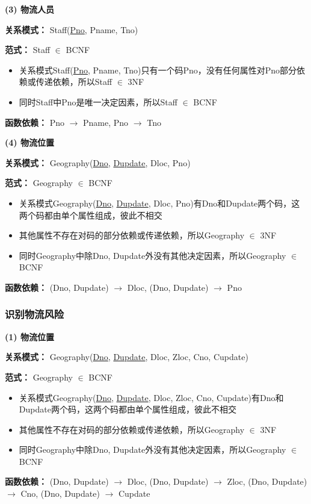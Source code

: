 \documentclass[12pt]{article}
\begin{document}
\vspace{0.3cm}
\noindent \textbf{(3) 物流人员} \par 
\noindent \textbf{关系模式：} Staff(\uline{Pno}, Pname, Tno) \par 
\noindent \textbf{范式：} Staff $\in$ BCNF \par 
\begin{itemize}
	\item 关系模式Staff(\uline{Pno}, Pname, Tno)只有一个码Pno，没有任何属性对Pno部分依赖或传递依赖，所以Staff $\in$ 3NF
	\item 同时Staff中Pno是唯一决定因素，所以Staff $\in$ BCNF
\end{itemize}
\textbf{函数依赖：} Pno $\rightarrow$ Pname, Pno $\rightarrow$ Tno

\vspace{0.3cm}
\noindent \textbf{(4) 物流位置} \par 
\noindent \textbf{关系模式：} Geography(\uline{Dno}, \uline{Dupdate}, Dloc, Pno) \par 
\noindent \textbf{范式：} Geography $\in$ BCNF \par 
\begin{itemize}
	\item 关系模式Geography(\uline{Dno}, \uline{Dupdate}, Dloc, Pno)有Dno和Dupdate两个码，这两个码都由单个属性组成，彼此不相交
	\item 其他属性不存在对码的部分依赖或传递依赖，所以Geography $\in$ 3NF
	\item 同时Geography中除Dno, Dupdate外没有其他决定因素，所以Geography $\in$ BCNF
\end{itemize}
\textbf{函数依赖：} (Dno, Dupdate) $\rightarrow$ Dloc, (Dno, Dupdate) $\rightarrow$ Pno

\subsubsection{识别物流风险}

\noindent \textbf{(1) 物流位置} \par 
\noindent \textbf{关系模式：} Geography(\uline{Dno}, \uline{Dupdate}, Dloc, Zloc, Cno, Cupdate) \par 
\noindent \textbf{范式：} Geography $\in$ BCNF \par
\begin{itemize}
	\item 关系模式Geography(\uline{Dno}, \uline{Dupdate}, Dloc, Zloc, Cno, Cupdate)有Dno和Dupdate两个码，这两个码都由单个属性组成，彼此不相交
	\item 其他属性不存在对码的部分依赖或传递依赖，所以Geography $\in$ 3NF
	\item 同时Geography中除Dno, Dupdate外没有其他决定因素，所以Geography $\in$ BCNF
\end{itemize} 
\textbf{函数依赖：} (Dno, Dupdate) $\rightarrow$ Dloc, (Dno, Dupdate) $\rightarrow$ Zloc, (Dno, Dupdate) $\rightarrow$ Cno, (Dno, Dupdate) $\rightarrow$ Cupdate
\end{document}
